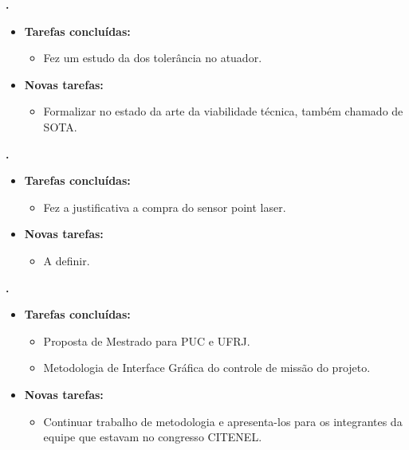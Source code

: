 \begin{itemize}
	  \textbf{\renan.} 
	\begin{itemize}
		\item \textbf{Tarefas concluídas:}
			\begin{itemize}    
				\item Fez um estudo da dos tolerância no atuador.
			\end{itemize}
		
		\item \textbf{Novas tarefas:}
			\begin{itemize} 
			    \item Formalizar no estado da arte da viabilidade técnica, também
			    chamado de SOTA.
			\end{itemize}
	\end{itemize}	
	
	
	  \textbf{\elael.} 
	\begin{itemize}
		\item \textbf{Tarefas concluídas:}
			\begin{itemize}    
				\item Fez a justificativa a compra do sensor point laser. 
			\end{itemize}
		
		\item \textbf{Novas tarefas:}
			\begin{itemize} 
			    \item A definir.
			\end{itemize}
	\end{itemize}			
			
			
   \textbf{\julia.} 
	\begin{itemize}
		\item \textbf{Tarefas concluídas:}
			\begin{itemize}    
				\item Proposta de Mestrado para PUC e UFRJ.
				\item Metodologia de Interface Gráfica do controle de missão do projeto.
			\end{itemize}
		
		\item \textbf{Novas tarefas:}
			\begin{itemize} 
			    \item Continuar trabalho de metodologia e apresenta-los para os
			    integrantes da equipe que estavam no congresso CITENEL.
			\end{itemize}
	\end{itemize}		




\end{itemize}
